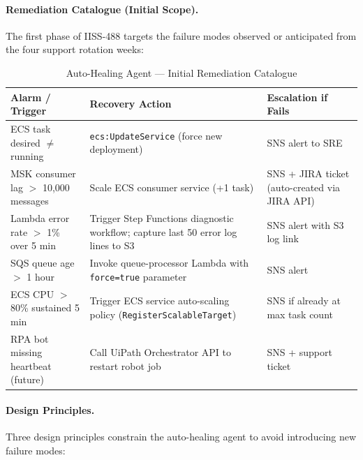\paragraph{Remediation Catalogue (Initial Scope).}
The first phase of IISS-488 targets the failure modes observed or anticipated
from the four support rotation weeks:

\begin{table}[ht]
\centering
\caption{Auto-Healing Agent --- Initial Remediation Catalogue}
\label{tab:autohealing_catalogue}
\begin{tabular}{p{4.5cm}p{4.0cm}p{3.5cm}}
\toprule
\textbf{Alarm / Trigger} & \textbf{Recovery Action} & \textbf{Escalation if Fails} \\
\midrule
ECS task desired $\neq$ running & \texttt{ecs:UpdateService} (force new deployment) & SNS alert to SRE \\
\midrule
MSK consumer lag $>$ 10{,}000 messages & Scale ECS consumer service (+1 task) & SNS + JIRA ticket (auto-created via JIRA API) \\
\midrule
Lambda error rate $>$ 1\% over 5 min & Trigger Step Functions diagnostic workflow; capture last 50 error log lines to S3 & SNS alert with S3 log link \\
\midrule
SQS queue age $>$ 1 hour & Invoke queue-processor Lambda with \texttt{force=true} parameter & SNS alert \\
\midrule
ECS CPU $>$ 80\% sustained 5 min & Trigger ECS service auto-scaling policy (\texttt{RegisterScalableTarget}) & SNS if already at max task count \\
\midrule
RPA bot missing heartbeat (future) & Call UiPath Orchestrator API to restart robot job & SNS + support ticket \\
\bottomrule
\end{tabular}
\end{table}

\paragraph{Design Principles.}

Three design principles constrain the auto-healing agent to avoid introducing
new failure modes:

